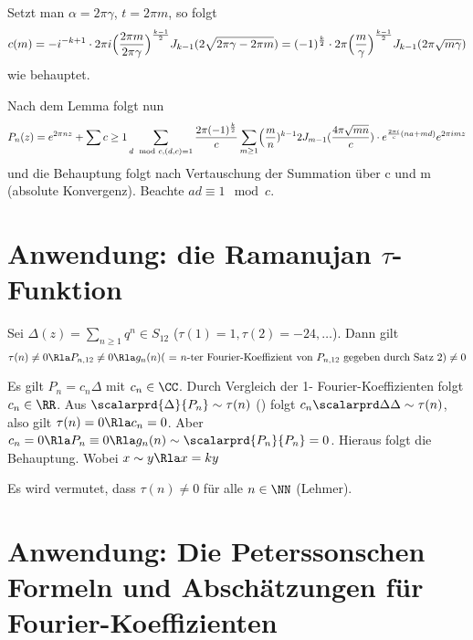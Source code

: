 \begin{bewe}
\begin{bewe}
Setzt man $\alpha = 2\pi \gamma$, $t = 2\pi m$, so folgt
\[
	c(m) = -i^{-k+1} \cdot 2\pi i \Bigl( \frac{2\pi m}{2\pi \gamma}\Bigr)^{\frac{k-1}{2}} J_{k-1} (2\sqrt{2\pi \gamma - 2 \pi m}) = (-1)^{\frac{k}{2}} \cdot 2\pi \Bigl(\frac{m}{\gamma}\Bigr)^{\frac{k-1}{2}} J_{k-1} (2\pi \sqrt{m\gamma})
\]
wie behauptet.


\end{bewe}

Nach dem Lemma folgt nun
\[
	P_n(z) = e^{2\pi nz} + \sum{c\geq1} \sum_{d \mod c, (d,c) = 1} \frac{2\pi (-1)^{\frac{k}{2}}}{c} \sum_{m\geq 1} \Bigl(\frac{m}{n})^{k-1}{2} J_{m-1} (\frac{4\pi \sqrt{mn}}{c}) \cdot e^{\frac{2\pi i}{c}(na+md)} e^{2\pi imz}
\]
und die Behauptung folgt nach Vertauschung der Summation über c und m (absolute Konvergenz). Beachte $ad \equiv 1 \mod c$.

\end{bewe}

\section{Anwendung: die Ramanujan $\tau$-Funktion}

\begin{satz}
	Sei $\Delta(z) = \sum_{n \geq 1} q^n \in S_{12}$ ($\tau(1) = 1, \tau(2) = -24, \ldots $).
	Dann gilt
	\[
		\tau(n) \not= 0 \Rla P_{n,12} \not= 0 \Rla g_n(n) \text{( = $n$-ter Fourier-Koeffizient von $P_{n,12}$ gegeben durch Satz 2)} \not= 0
	\]
\end{satz}
\begin{bewe}
	Es gilt $P_n = c_n\Delta$ mit $c_n \in \CC$.
	Durch Vergleich der 1- Fourier-Koeffizienten folgt $c_n \in \RR$.
	Aus $\scalarprd{\Delta}{P_n} \sim \tau(n)$ () folgt $c_n \scalarprd \Delta \Delta \sim \tau(n)$, also gilt $\tau(n) = 0 \Rla c_n = 0$. Aber $c_n = 0 \Rla P_n \equiv 0 \Rla g_n(n) \sim \scalarprd{P_n}{P_n} = 0$.
	Hieraus folgt die Behauptung.
	Wobei $x \sim y \Rla x = ky$
\end{bewe}

\begin{beme}
	Es wird vermutet, dass $\tau(n) \not= 0$ für alle $n\in\NN$ (Lehmer).
\end{beme}

\section{Anwendung: Die Peterssonschen Formeln und Abschätzungen für Fourier-Koeffizienten}

